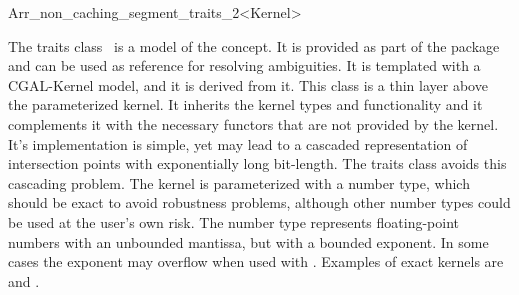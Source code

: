 \ccRefPageBegin
\begin{ccRefClass}{Arr_non_caching_segment_traits_2<Kernel>}
    
\ccDefinition 
  The traits class \ccRefName\ is a
  model of the  concept. It is provided as part of
  the package and can be used as reference for resolving ambiguities. 
  It is templated with a CGAL-Kernel model, and it is derived from it. This
  class is a thin layer above the parameterized kernel. It inherits the kernel
  types and functionality and it complements it with the necessary functors that
  are not provided by the kernel. It's implementation is simple, yet may lead to
  a cascaded representation of intersection points with exponentially long
  bit-length. The  traits class avoids this
  cascading problem. The kernel is parameterized with a number type, which
  should be exact to avoid robustness problems, although other number types
  could be used at the user's own risk. The  number
  type represents floating-point numbers with an unbounded mantissa, but with a
  bounded exponent. In some cases the exponent may overflow when used with
  . Examples of exact
  kernels are  and .
    
 
\ccIsModel

\end{ccRefClass}
\ccRefPageEnd
